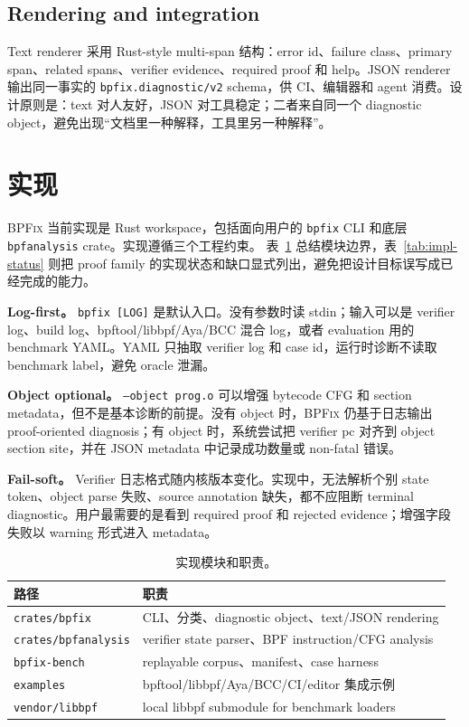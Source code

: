 \documentclass[letterpaper,twocolumn,10pt]{article}
\newcommand{\sys}{\textsc{BPFix}\xspace}
\newcommand{\code}[1]{\texttt{#1}}
\begin{document}
\subsection{Rendering and integration}

Text renderer 采用 Rust-style multi-span 结构：error id、failure class、primary span、related spans、verifier evidence、required proof 和 help。JSON renderer 输出同一事实的 \code{bpfix.diagnostic/v2} schema，供 CI、编辑器和 agent 消费。设计原则是：text 对人友好，JSON 对工具稳定；二者来自同一个 diagnostic object，避免出现“文档里一种解释，工具里另一种解释”。

\section{实现}
\label{sec:implementation}

\sys 当前实现是 Rust workspace，包括面向用户的 \code{bpfix} CLI 和底层 \code{bpfanalysis} crate。实现遵循三个工程约束。
表~\ref{tab:impl} 总结模块边界，表~\ref{tab:impl-status} 则把 proof family 的实现状态和缺口显式列出，避免把设计目标误写成已经完成的能力。

\textbf{Log-first。} \code{bpfix [LOG]} 是默认入口。没有参数时读 stdin；输入可以是 verifier log、build log、bpftool/libbpf/Aya/BCC 混合 log，或者 evaluation 用的 benchmark YAML。YAML 只抽取 verifier log 和 case id，运行时诊断不读取 benchmark label，避免 oracle 泄漏。

\textbf{Object optional。} \code{--object prog.o} 可以增强 bytecode CFG 和 section metadata，但不是基本诊断的前提。没有 object 时，\sys 仍基于日志输出 proof-oriented diagnosis；有 object 时，系统尝试把 verifier pc 对齐到 object section site，并在 JSON metadata 中记录成功数量或 non-fatal 错误。

\textbf{Fail-soft。} Verifier 日志格式随内核版本变化。实现中，无法解析个别 state token、object parse 失败、source annotation 缺失，都不应阻断 terminal diagnostic。用户最需要的是看到 required proof 和 rejected evidence；增强字段失败以 warning 形式进入 metadata。

\begin{table}[t]
\centering
\small
\caption{实现模块和职责。}
\label{tab:impl}
\begin{tabularx}{\columnwidth}{@{}l X@{}}
\toprule
路径 & 职责 \\
\midrule
\code{crates/bpfix} & CLI、分类、diagnostic object、text/JSON rendering \\
\code{crates/bpfanalysis} & verifier state parser、BPF instruction/CFG analysis \\
\code{bpfix-bench} & replayable corpus、manifest、case harness \\
\code{examples} & bpftool/libbpf/Aya/BCC/CI/editor 集成示例 \\
\code{vendor/libbpf} & local libbpf submodule for benchmark loaders \\
\bottomrule
\end{tabularx}
\end{table}
\end{document}
